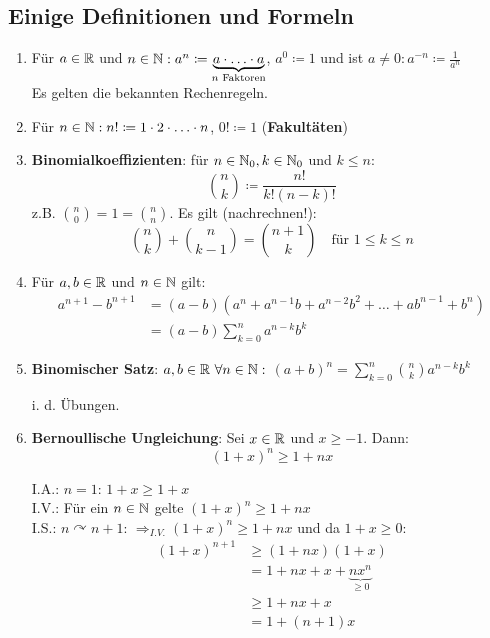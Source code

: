\subsection*{Einige Definitionen und Formeln}    
\begin{enumerate}
	\item Für $a \in \mathbb{R}$ und $n \in \mathbb{N}: a^{n} \coloneqq \underbrace{a \cdot \dotsc \cdot a}_{n \text{ Faktoren}}$, $a^{0} \coloneqq 1$ und ist $a \neq 0: a^{-n} \coloneqq \frac{1}{a^{n}}$ \\
		Es gelten die bekannten Rechenregeln.
	\item Für $n \in \mathbb{N}: n! \coloneqq 1 \cdot 2 \cdot \dotsc \cdot n$, $0! \coloneqq 1$ (\textbf{Fakultäten})
	\item \textbf{Binomialkoeffizienten}: für $n \in \mathbb{N}_{0}, k \in \mathbb{N}_{0}$ und $k \leq n$:
		$$
			\binom{n}{k} \coloneqq \frac{n!}{k!(n - k)!}
		$$
		z.B. $\binom{n}{0} = 1 = \binom{n}{n}$. Es gilt (nachrechnen!): \\
		$$
			\binom{n}{k} + \binom{n}{k - 1} = \binom{n + 1}{k} \quad \text{für } 1 \leq k \leq n
		$$
	\item Für $a, b \in \mathbb{R}$ und $n \in \mathbb{N}$ gilt: 
		\begin{align*}
			a^{n + 1} - b^{n + 1} & = (a - b) \left(a^{n} + a^{n-1}b + a^{n-2}b^{2} + \dotsc + a b^{n-1} + b^{n} \right) \\
				& = (a - b) \sum_{k = 0}^{n} a^{n -k}b^{k}
		\end{align*}
	\item \textbf{Binomischer Satz}: $a, b \in \mathbb{R} ~\forall n \in \mathbb{N}:$ $(a + b)^{n} = \sum_{k = 0}^{n} \binom{n}{k} a^{n-k}b^{k}$
		\begin{beweis}
			i. d. Übungen.
		\end{beweis}
	\item \textbf{Bernoullische Ungleichung}: Sei $x \in \mathbb{R}$ und $x \geq -1$. Dann:
		$$ (1 + x)^{n} \geq 1 + n x$$
		\begin{beweis}[induktiv]
			I.A.: $n = 1$: $1 + x \geq 1 + x$ \\
			I.V.: Für ein $n \in \mathbb{N}$ gelte $(1 + x)^{n} \geq 1 + nx$ \\
			I.S.: $n \curvearrowright n + 1$: $\Rightarrow_{I.V.} (1 + x)^{n} \geq 1 + n x$ und da $1 + x \geq 0$:
			\begin{align*}
				(1 + x)^{n + 1} & \geq (1 + nx)(1 + x) \\
								& = 1 + nx + x + \underbrace{nx^{n}}_{\geq 0} \\
								& \geq 1 + nx + x \\
								& = 1 + (n + 1)x
			\end{align*}
		\end{beweis}
\end{enumerate}


